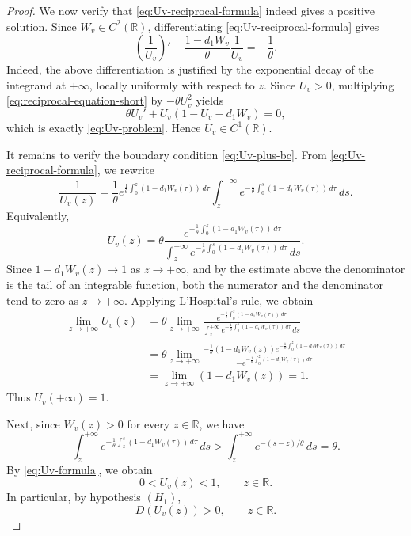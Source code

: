 \documentclass[10pt,a4paper]{amsart}
\begin{document}
\begin{proof}
We now verify that \eqref{eq:Uv-reciprocal-formula} indeed gives a positive solution. Since $W_v\in C^2(\mathbb R)$, differentiating \eqref{eq:Uv-reciprocal-formula} gives
\begin{equation}\label{eq:reciprocal-equation-short}
\left(\frac{1}{U_v}\right)'-\frac{1-d_1W_v}{\theta}\frac{1}{U_v}=-\frac{1}{\theta}.
\end{equation}
Indeed, the above differentiation is justified by the exponential decay of the integrand at $+\infty$, locally uniformly with respect to $z$. Since $U_v>0$, multiplying \eqref{eq:reciprocal-equation-short} by $-\theta U_v^2$ yields
\begin{equation*}
\theta U_v'+U_v(1-U_v-d_1W_v)=0,
\end{equation*}
which is exactly \eqref{eq:Uv-problem}. Hence $U_v\in C^1(\mathbb R)$.

It remains to verify the boundary condition \eqref{eq:Uv-plus-bc}. From \eqref{eq:Uv-reciprocal-formula}, we rewrite
\begin{equation*}
\frac{1}{U_v(z)}=\frac{1}{\theta}e^{\frac{1}{\theta}\int_0^z(1-d_1W_v(\tau))\,d\tau}\int_z^{+\infty}e^{-\frac{1}{\theta}\int_0^s(1-d_1W_v(\tau))\,d\tau}\,ds.
\end{equation*}
Equivalently,
\begin{equation*}
U_v(z)=\theta\frac{e^{-\frac{1}{\theta}\int_0^z(1-d_1W_v(\tau))\,d\tau}}{\int_z^{+\infty}e^{-\frac{1}{\theta}\int_0^s(1-d_1W_v(\tau))\,d\tau}\,ds}.
\end{equation*}
Since $1-d_1W_v(z)\to1$ as $z\to+\infty$, and by the estimate above the denominator is the tail of an integrable function, both the numerator and the denominator tend to zero as $z\to+\infty$. Applying L'Hospital's rule, we obtain
\begin{align*}
\lim_{z\to+\infty}U_v(z)
&=\theta\lim_{z\to+\infty}\frac{e^{-\frac{1}{\theta}\int_0^z(1-d_1W_v(\tau))\,d\tau}}{\int_z^{+\infty}e^{-\frac{1}{\theta}\int_0^s(1-d_1W_v(\tau))\,d\tau}\,ds
}\\
&=\theta\lim_{z\to+\infty}\frac{-\frac{1}{\theta}(1-d_1W_v(z))e^{-\frac{1}{\theta}\int_0^z(1-d_1W_v(\tau))\,d\tau}}{-e^{-\frac{1}{\theta}\int_0^z(1-d_1W_v(\tau))\,d\tau}
}\\
&=\lim_{z\to+\infty}(1-d_1W_v(z))=1.
\end{align*}
Thus $U_v(+\infty)=1$.

Next, since $W_v(z)>0$ for every $z\in\mathbb R$,  we have
\begin{equation*}
\int_z^{+\infty}e^{-\frac{1}{\theta}\int_z^s(1-d_1W_v(\tau))\,d\tau}\,ds>
\int_z^{+\infty}e^{-(s-z)/\theta}\,ds=\theta.
\end{equation*}
By \eqref{eq:Uv-formula}, we obtain
\begin{equation*}
0<U_v(z)<1,\qquad z\in\mathbb R.
\end{equation*}
In particular, by hypothesis $(H_1)$,
\begin{equation*}
D(U_v(z))>0,\qquad z\in\mathbb R.
\end{equation*}


\end{proof}
\end{document}
